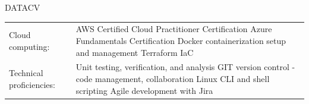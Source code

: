 \documentclass[letterpaper]{article}
\newenvironment{skillslist}
        {
            \hspace*{-0.07in}\begin{tabular}[t]{ l L{5.17in} }
        }{
            \end{tabular}
        }
\newcommand{\impt}[1]{\uline{#1}}
\begin{document}
\begin{taggedblock}{DATACV}
\begin{skillslist}
                \\
            Cloud computing:&
                AWS Certified Cloud Practitioner Certification \linebreak
                Azure Fundamentals Certification \linebreak
                Docker containerization setup and management \linebreak
                Terraform IaC \linebreak
                \\
            Technical proficiencies:&
                Unit testing, verification, and analysis\linebreak
                GIT version control - code management, collaboration \linebreak
                Linux CLI and shell scripting \linebreak
                Agile development with Jira \linebreak
                \\
        \end{skillslist}
    \end{taggedblock}
\end{document}
